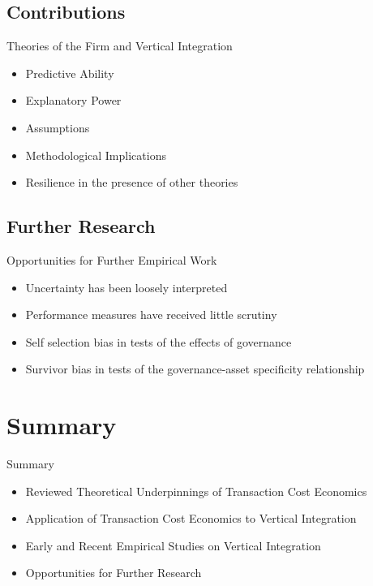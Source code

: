 \documentclass{beamer}
\begin{document}
\subsection{Contributions}
\begin{frame}{Theories of the Firm and Vertical Integration}{}
\begin{itemize}
\item<1->{Predictive Ability}
\item<2->{Explanatory Power}
\item<3->{Assumptions}
\item<4->{Methodological Implications}
\item<5->{Resilience in the presence of other theories}
\end{itemize}
\end{frame}

\subsection{Further Research}
\begin{frame}{Opportunities for Further Empirical Work}{}
\begin{itemize}
\item{Uncertainty has been loosely interpreted}
\item{Performance measures have received little scrutiny}
\item{Self selection bias in tests of the effects of governance}
\item{Survivor bias in tests of the governance-asset specificity relationship}
\end{itemize}
\end{frame}

\section{Summary}
\begin{frame}{Summary}{}
\begin{itemize}
\item<1->{Reviewed Theoretical Underpinnings of Transaction Cost Economics}
\item<2->{Application of Transaction Cost Economics to Vertical Integration}
\item<3->{Early and Recent Empirical Studies on Vertical Integration}
\item<4->{Opportunities for Further Research}
\end{itemize}
\end{frame}



\end{document}
